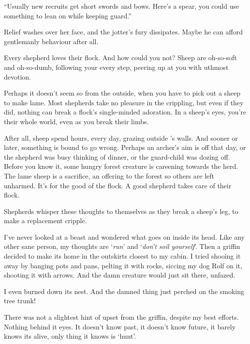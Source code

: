 \begin{multicols}{2}
\begin{exampletext}
  ``Usually new recruits get short swords and bows.
  Here's a spear, you could use something to lean on while keeping guard.''

  Relief washes over her face, and the \gls{jotter}'s fury dissipates.
  Maybe he can afford gentlemanly behaviour after all.
\end{exampletext}

\begin{exampletext}
  Every shepherd loves their flock.
  And how could you not?
  Sheep are oh-so-soft and oh-so-dumb, following your every step, peering up at you with uthmost devotion.

  Perhaps it doesn't seem so from the outside, when you have to pick out a sheep to make lame.
  Most shepherds take no pleasure in the crippling, but even if they did, nothing can break a flock's single-minded adoration.
  In a sheep's eyes, you're their whole world, even as you break their limbs.

  After all, sheep spend hours, every day, grazing outside 's walls.
  And sooner or later, something is bound to go wrong.
  Perhaps an archer's aim is off that day, or the shepherd was busy thinking of dinner, or the guard-child was dozing off.
  Before you know it, some hungry forest creature is careening towards the herd.
  The lame sheep is a sacrifice, an offering to the forest so others are left unharmed.
  It's for the good of the flock.
  A good shepherd takes care of their flock.

  Shepherds whisper these thoughts to themselves as they break a sheep's leg, to make a replacement cripple.
\end{exampletext}

\begin{exampletext}
  I've never looked at a beast and wondered what goes on inside its head.
  Like any other sane person, my thoughts are `\emph{run}' and `\emph{don't soil yourself}'.
  Then a griffin decided to make its home in the outskirts closest to my cabin.
  I tried shooing it away by banging pots and pans, pelting it with rocks, siccing my dog Rolf on it, shooting it with arrows.
  And the damn creature would just sit there, unfazed.

  I even burned down its nest. And the damned thing just perched on the smoking tree trunk!

  There was not a slightest hint of upset from the griffin, despite my best efforts.
  Nothing behind it eyes.
  It doesn't know past, it doesn't know future, it barely knows its alive, only thing it knows is `hunt'.


\end{exampletext}
\end{multicols}
